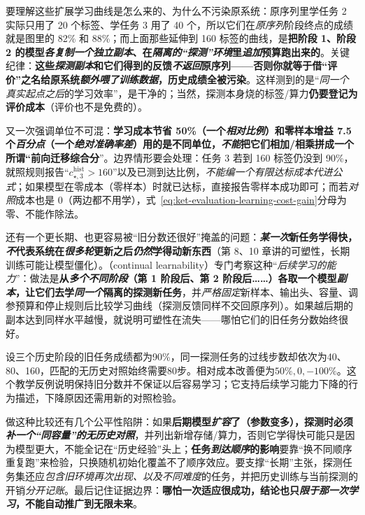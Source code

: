 要理解这些扩展学习曲线是怎么来的、为什么不污染原系统：原序列里学任务 2 实际只用了 20 个标签、学任务 3 用了 40 个，所以它们在\emph{原序列}阶段终点的成绩就是图里的 82\% 和 88\%；而上面那些延伸到 160 标签的曲线，是\textbf{把阶段 1、阶段 2 的模型\emph{各复制一个独立副本}、在\emph{隔离的“探测”环境}里\emph{追加}预算跑出来的}。关键纪律：\textbf{\textbf{这些\emph{探测副本}和它们得到的反馈\emph{不返回}原序列}——否则你就等于借“评价”之名给原系统\emph{额外喂了训练数据}，历史成绩全被污染}。这样测到的是“\emph{同一个真实起点}\emph{之后}的学习效率”，是干净的；当然，探测本身烧的标签/算力\textbf{仍要登记为评价成本}（评价也不是免费的）。

又一次强调单位不可混：\textbf{学习成本节省 50\%（一个\emph{相对比例}）和零样本增益 7.5 个\emph{百分点}（一个\emph{绝对准确率差}）用的是不同单位，\emph{不能}把它们相加/相乘拼成一个所谓“前向迁移综合分}”。边界情形要会处理：任务 3 若到 160 标签仍没到 90\%，就照规则报告“$c_{\star,3}^{\mathrm{hist}}>160$”以及已测到达比例，\emph{不能编一个有限达标成本代进公式}；如果模型在零成本（零样本）时就已达标，直接报告零样本成功即可；而若\emph{对照}成本也是 0（两边都不用学），式~\eqref{eq:ket-evaluation-learning-cost-gain}分母为零、不能作除法。

还有一个更长期、也更容易被“旧分数还很好”掩盖的问题：\textbf{\emph{某一次}新任务学得快，\emph{不}代表系统在\emph{很多轮}更新之后\emph{仍然}学得动新东西}（第 8、10 章讲的可塑性，长期训练可能让模型僵化）。（continual learnability）专门考察这种“\emph{后续学习的能力}”：做法是\textbf{从\emph{多个不同阶段}（第 1 阶段后、第 2 阶段后……）各取一个模型\emph{副本}，让它们去学\emph{同一个}隔离的探测新任务}，并\emph{严格固定}新样本、输出头、容量、调参预算和停止规则后比较学习曲线（探测反馈同样不交回原序列）。如果越后期的副本达到同样水平越慢，就说明可塑性在流失——哪怕它们的旧任务分数始终很好。

设三个历史阶段的旧任务成绩都为90\%，同一探测任务的过线步数却依次为40、80、160，匹配的无历史对照始终需要80步。相对成本改善便为$50\%,0,-100\%$。这个教学反例说明保持旧分数并不保证以后容易学习；它支持后续学习能力下降的行为描述，下降原因还需用新的对照检验。

做这种比较还有几个公平性陷阱：如果\textbf{后期模型\emph{扩容}了（参数变多），探测时必须\emph{补一个“同容量”的无历史对照}}，并列出新增存储/算力，否则它学得快可能只是因为模型更大，不能全记在“历史经验”头上；\textbf{任务\emph{到达顺序}的影响}要靠“换不同顺序重复跑”来检验，只换随机初始化覆盖不了顺序效应。要支撑“长期”主张，探测任务集还应\emph{包含旧环境再次出现、以及不同难度}的任务，并把历史训练与当前探测的开销\emph{分开记账}。最后记住证据边界：\textbf{哪怕一次适应很成功，结论也只\emph{限于那一次学习}，不能自动推广到无限未来}。

